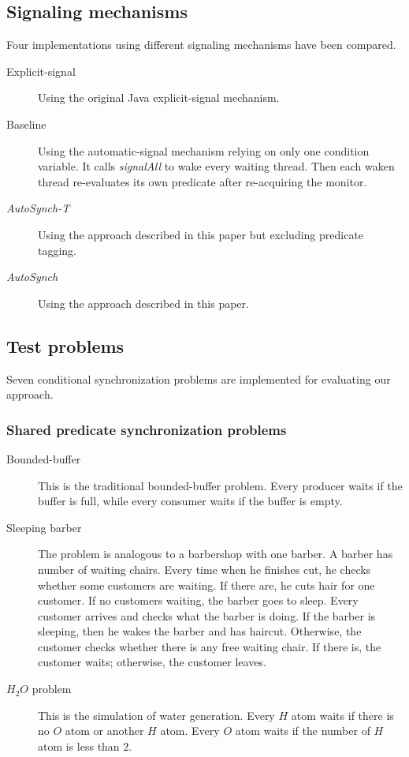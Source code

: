 \documentclass{sigplanconf}
\begin{document}
\subsection{Signaling mechanisms}
Four implementations using different signaling mechanisms have been 
compared. 
\begin{description}
    \item[Explicit-signal] Using the original Java explicit-signal mechanism. 
    \item[Baseline] Using the automatic-signal mechanism relying on only
        one condition variable. It calls {\em signalAll} to wake
        every waiting thread. Then each waken thread re-evaluates its own 
        predicate after re-acquiring the monitor.
    \item[{\em AutoSynch-T}] Using the approach described in this paper but excluding
        predicate tagging. 
    \item[{\em AutoSynch}] Using the approach described in this paper. 
\end{description}

\subsection{Test problems}
Seven conditional synchronization problems are implemented for evaluating our
approach. 

\subsubsection{Shared predicate synchronization problems}
\begin{description}
    \item[Bounded-buffer \cite{dijk65, dijk71}] This is the traditional 
        bounded-buffer problem. Every producer waits if the buffer is full,
        while every consumer waits if the buffer is empty. 
    \item [Sleeping barber \cite{dijk65, dijk71}] The problem is analogous 
        to a barbershop with one barber. A barber has number of waiting
        chairs. Every time when he finishes cut, he checks whether some
        customers are waiting. If there are, he cuts hair for one customer. If 
        no customers waiting, the barber goes to sleep. Every customer arrives
        and checks what the barber is doing. If the barber is sleeping, then he 
        wakes the barber and has haircut. Otherwise, the customer checks
        whether there is any free waiting chair. If there is, the customer
        waits; otherwise, the customer leaves. 
    \item [$H_2O$ problem \cite{and00}] This is the simulation of water
        generation. Every $H$ atom waits if there is no $O$ atom or another $H$
        atom. Every $O$ atom waits if the number of $H$ atom is less than $2$. 
\end{description}
\end{document}
